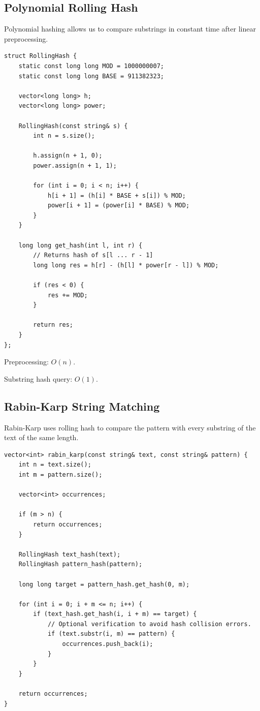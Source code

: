 \documentclass[11pt]{article}
\begin{document}
\subsection{Polynomial Rolling Hash}

Polynomial hashing allows us to compare substrings in constant time after
linear preprocessing.

\begin{lstlisting}
struct RollingHash {
    static const long long MOD = 1000000007;
    static const long long BASE = 911382323;

    vector<long long> h;
    vector<long long> power;

    RollingHash(const string& s) {
        int n = s.size();

        h.assign(n + 1, 0);
        power.assign(n + 1, 1);

        for (int i = 0; i < n; i++) {
            h[i + 1] = (h[i] * BASE + s[i]) % MOD;
            power[i + 1] = (power[i] * BASE) % MOD;
        }
    }

    long long get_hash(int l, int r) {
        // Returns hash of s[l ... r - 1]
        long long res = h[r] - (h[l] * power[r - l]) % MOD;

        if (res < 0) {
            res += MOD;
        }

        return res;
    }
};
\end{lstlisting}

Preprocessing: $O(n)$.

Substring hash query: $O(1)$.

\subsection{Rabin-Karp String Matching}

Rabin-Karp uses rolling hash to compare the pattern with every substring of
the text of the same length.

\begin{lstlisting}
vector<int> rabin_karp(const string& text, const string& pattern) {
    int n = text.size();
    int m = pattern.size();

    vector<int> occurrences;

    if (m > n) {
        return occurrences;
    }

    RollingHash text_hash(text);
    RollingHash pattern_hash(pattern);

    long long target = pattern_hash.get_hash(0, m);

    for (int i = 0; i + m <= n; i++) {
        if (text_hash.get_hash(i, i + m) == target) {
            // Optional verification to avoid hash collision errors.
            if (text.substr(i, m) == pattern) {
                occurrences.push_back(i);
            }
        }
    }

    return occurrences;
}
\end{lstlisting}
\end{document}
